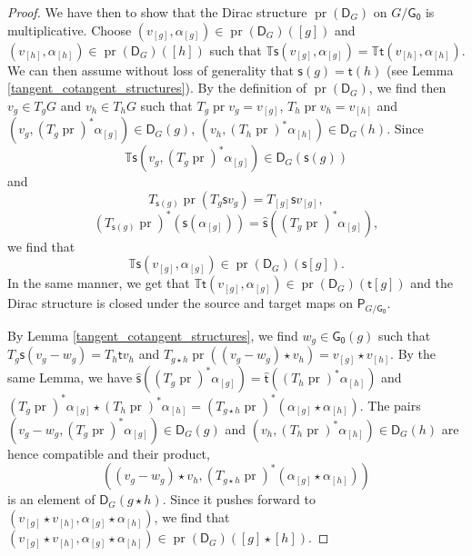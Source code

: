 \documentclass{amsart}
\theoremstyle{definition}
\begin{document}
\begin{proof}
We have then to show that the Dirac structure $\operatorname{pr}(\mathsf D_G)$
on $G/\mathsf{G_0}$ is multiplicative.  
Choose  $(v_{[g]}, \alpha_{[g]})
\in \operatorname{pr}(\mathsf D_G)([g])$
and $(v_{[h]}, \alpha_{[h]})\in \operatorname{pr}(\mathsf D_G)([h])$
such that ${{\mathbb{T}}}{{\mathsf{s}}}(v_{[g]}, \alpha_{[g]})={{\mathbb{T}}}{{\mathsf{t}}}(v_{[h]}, \alpha_{[h]})$. 
We can then assume without loss of generality that ${{\mathsf{s}}}(g)={{\mathsf{t}}}(h)$
(see Lemma \ref{tangent_cotangent_structures}).
By the definition of $\operatorname{pr}(\mathsf D_G)$, we find 
then $v_g\in T_gG$ and $v_h\in T_hG$
such that $T_g\operatorname{pr} v_g= v_{[g]}$, 
$T_h\operatorname{pr} v_h=v_{[h]}$ and 
$(v_g, (T_g\operatorname{pr})^*\alpha_{[g]})\in\mathsf D_G(g)$, 
$(v_h, (T_h\operatorname{pr})^*\alpha_{[h]})\in\mathsf D_G(h)$.
Since $${{\mathbb{T}}}{{\mathsf{s}}}(v_g,(T_g\operatorname{pr})^*\alpha_{[g]})\in\mathsf D_G({{\mathsf{s}}}(g))$$
and $$T_{{{\mathsf{s}}}(g)}\operatorname{pr}(T_g{{\mathsf{s}}} v_g)=T_{[g]}{{\mathsf{s}}} v_{[g]},$$
$$(T_{{{\mathsf{s}}}(g)}\operatorname{pr})^*({{\mathsf{s}}}(\alpha_{[g]}))=\hat{{\mathsf{s}}}((T_g\operatorname{pr})^*\alpha_{[g]}),$$ we find that 
$${{\mathbb{T}}}{{\mathsf{s}}}(v_{[g]}, \alpha_{[g]})\in \operatorname{pr}(\mathsf D_G)({{\mathsf{s}}}[g]).$$ In the same manner, 
we get that 
${{\mathbb{T}}}{{\mathsf{t}}}(v_{[g]}, \alpha_{[g]})\in \operatorname{pr}(\mathsf D_G)({{\mathsf{t}}}[g])$ and the Dirac structure 
is closed under the source and target maps on $\mathsf P_{G/\mathsf{G_0}}$.

By Lemma \ref{tangent_cotangent_structures}, we find 
$w_g\in \mathsf{G_0}(g)$ such that $T_g{{\mathsf{s}}}(v_g-w_g)=T_h{{\mathsf{t}}} v_h$
and $T_{g\star h}\operatorname{pr}((v_g-w_g) \star v_h)=v_{[g]}\star v_{[h]}$. 
By the same Lemma, we have 
$\hat{{\mathsf{s}}}((T_g\operatorname{pr})^*\alpha_{[g]})=\hat{{\mathsf{t}}}((T_h\operatorname{pr})^*\alpha_{[h]})$
and $(T_g\operatorname{pr})^*\alpha_{[g]}\star (T_h\operatorname{pr})^*\alpha_{[h]}
=(T_{g\star h}\operatorname{pr})^*(\alpha_{[g]}\star \alpha_{[h]})$. 
The pairs
$(v_g-w_g, (T_g\operatorname{pr})^*\alpha_{[g]})\in\mathsf D_G(g)$ and 
$(v_h, (T_h\operatorname{pr})^*\alpha_{[h]})\in\mathsf D_G(h)$
are hence compatible and their product, 
$$((v_g -w_g)\star v_h, (T_{g\star h}\operatorname{pr})^*(\alpha_{[g]}\star \alpha_{[h]}))$$
is an element of $\mathsf D_G(g\star h)$.
Since it pushes forward to $(v_{[g]}\star v_{[h]}, \alpha_{[g]}\star \alpha_{[h]})$, 
we find that $(v_{[g]}\star v_{[h]}, \alpha_{[g]}\star \alpha_{[h]})\in 
\operatorname{pr}(\mathsf D_G)([g]\star[h])$.


\end{proof}
\end{document}
